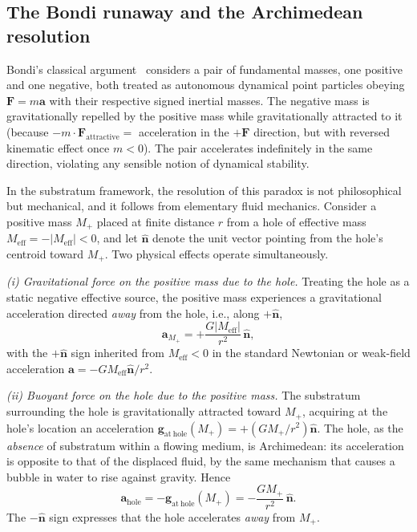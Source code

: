 \documentclass[%
  reprint,
  superscriptaddress,
  showpacs,
  showkeys,
  amsmath,amssymb,
  pra,
  longbibliography,
  floatfix,
  x11names
]{revtex4-2}
\begin{document}
\subsection{The Bondi runaway and the Archimedean resolution}
\label{sec:archimedes}

Bondi's classical argument~\cite{bondi-1957} considers a pair of fundamental masses, one positive and one negative, both treated as autonomous dynamical point particles obeying $\mathbf{F} = m \mathbf{a}$ with their respective signed inertial masses. The negative mass is gravitationally repelled by the positive mass while gravitationally attracted to it (because $-m \cdot \mathbf{F}_{\mathrm{attractive}} =$ acceleration in the $+\mathbf{F}$ direction, but with reversed kinematic effect once $m < 0$). The pair accelerates indefinitely in the same direction, violating any sensible notion of dynamical stability.

In the substratum framework, the resolution of this paradox is not philosophical but mechanical, and it follows from elementary fluid mechanics. Consider a positive mass $M_+$ placed at finite distance $r$ from a hole of effective mass $M_{\mathrm{eff}} = -|M_{\mathrm{eff}}| < 0$, and let $\hat{\mathbf{n}}$ denote the unit vector pointing from the hole's centroid toward $M_+$. Two physical effects operate simultaneously.

\emph{(i) Gravitational force on the positive mass due to the hole.} Treating the hole as a static negative effective source, the positive mass experiences a gravitational acceleration directed \emph{away} from the hole, i.e., along $+\hat{\mathbf{n}}$,
\begin{equation}
\mathbf{a}_{M_+} = +\frac{G|M_{\mathrm{eff}}|}{r^2}\, \hat{\mathbf{n}},
\label{eq:aMplus}
\end{equation}
with the $+\hat{\mathbf{n}}$ sign inherited from $M_{\mathrm{eff}} < 0$ in the standard Newtonian or weak-field acceleration $\mathbf{a} = -G M_{\mathrm{eff}} \hat{\mathbf{n}}/r^2$.

\emph{(ii) Buoyant force on the hole due to the positive mass.} The substratum surrounding the hole is gravitationally attracted toward $M_+$, acquiring at the hole's location an acceleration $\mathbf{g}_{\mathrm{at\ hole}}(M_+) = +(G M_+/r^2)\hat{\mathbf{n}}$. The hole, as the \emph{absence} of substratum within a flowing medium, is Archimedean: its acceleration is opposite to that of the displaced fluid, by the same mechanism that causes a bubble in water to rise against gravity. Hence
\begin{equation}
\mathbf{a}_{\mathrm{hole}} = -\mathbf{g}_{\mathrm{at\ hole}}(M_+) = -\frac{G M_+}{r^2}\, \hat{\mathbf{n}}.
\label{eq:archimedes}
\end{equation}
The $-\hat{\mathbf{n}}$ sign expresses that the hole accelerates \emph{away} from $M_+$.
\end{document}
